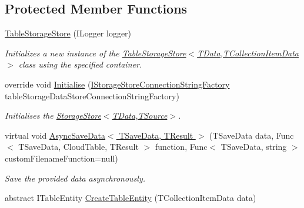 \subsection*{Protected Member Functions}
\begin{DoxyCompactItemize}
\item 
\hyperlink{classCqrs_1_1Azure_1_1BlobStorage_1_1TableStorageStore_aabc36bc46ffb22b716cc7769a641cfab_aabc36bc46ffb22b716cc7769a641cfab}{Table\+Storage\+Store} (I\+Logger logger)
\begin{DoxyCompactList}\small\item\em Initializes a new instance of the \hyperlink{classCqrs_1_1Azure_1_1BlobStorage_1_1TableStorageStore_aabc36bc46ffb22b716cc7769a641cfab_aabc36bc46ffb22b716cc7769a641cfab}{Table\+Storage\+Store$<$\+T\+Data,\+T\+Collection\+Item\+Data$>$} class using the specified container. \end{DoxyCompactList}\item 
override void \hyperlink{classCqrs_1_1Azure_1_1BlobStorage_1_1TableStorageStore_ae775f039a168cc48c731314c7e494bb6_ae775f039a168cc48c731314c7e494bb6}{Initialise} (\hyperlink{interfaceCqrs_1_1Azure_1_1BlobStorage_1_1IStorageStoreConnectionStringFactory}{I\+Storage\+Store\+Connection\+String\+Factory} table\+Storage\+Data\+Store\+Connection\+String\+Factory)
\begin{DoxyCompactList}\small\item\em Initialises the \hyperlink{classCqrs_1_1Azure_1_1BlobStorage_1_1StorageStore_ae7a725cdcb7de73e097b02c19463bae7_ae7a725cdcb7de73e097b02c19463bae7}{Storage\+Store$<$\+T\+Data,\+T\+Source$>$}. \end{DoxyCompactList}\item 
virtual void \hyperlink{classCqrs_1_1Azure_1_1BlobStorage_1_1TableStorageStore_a1a1dcf73501d4e7fc23e8137627de6f7_a1a1dcf73501d4e7fc23e8137627de6f7}{Async\+Save\+Data$<$ T\+Save\+Data, T\+Result $>$} (T\+Save\+Data data, Func$<$ T\+Save\+Data, Cloud\+Table, T\+Result $>$ function, Func$<$ T\+Save\+Data, string $>$ custom\+Filename\+Function=null)
\begin{DoxyCompactList}\small\item\em Save the provided {\itshape data}  asynchronously. \end{DoxyCompactList}\item 
abstract I\+Table\+Entity \hyperlink{classCqrs_1_1Azure_1_1BlobStorage_1_1TableStorageStore_a168a634f7f55bd264e01bd7e0f1f9f15_a168a634f7f55bd264e01bd7e0f1f9f15}{Create\+Table\+Entity} (T\+Collection\+Item\+Data data)

\end{DoxyCompactItemize}
